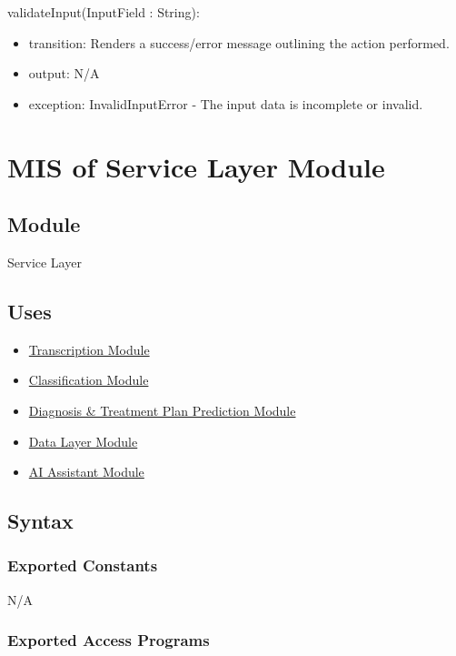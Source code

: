 \documentclass[12pt, titlepage]{article}
\begin{document}
\noindent validateInput(InputField : String):
\begin{itemize}
\item transition: Renders a success/error message outlining the action performed.
\item output: N/A
\item exception: InvalidInputError - The input data is incomplete or invalid.
\end{itemize}

\newpage

\section{MIS of Service Layer Module } \label{Module_Service Layer}


\subsection{Module}
Service Layer

\subsection{Uses}

\begin{itemize}
  \item \hyperref[Transcription_Module]{Transcription Module}
  \item \hyperref[Classification_Module]{Classification Module}
  \item \hyperref[diag_pred_mod]{Diagnosis \& Treatment Plan Prediction Module}
  \item \hyperref[Module_DataLayer]{Data Layer Module}
  \item \hyperref[Module_AIAssist]{AI Assistant Module}
\end{itemize}

\subsection{Syntax}

\subsubsection{Exported Constants}
N/A

\subsubsection{Exported Access Programs}
\end{document}
